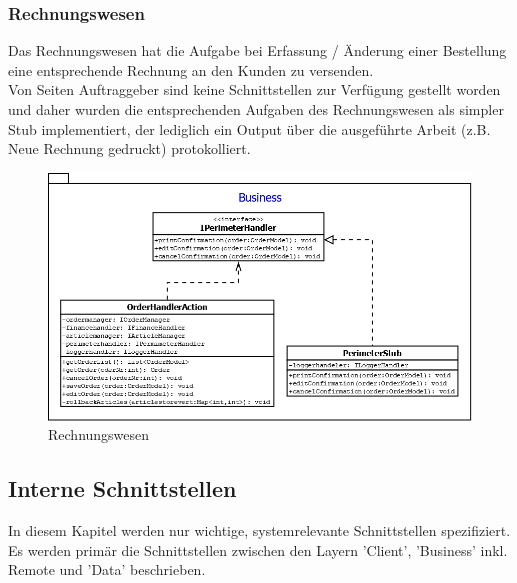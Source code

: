 \subsubsection{Rechnungswesen}
Das Rechnungswesen hat die Aufgabe bei Erfassung / Änderung einer Bestellung eine entsprechende Rechnung an den Kunden zu versenden.\\
Von Seiten Auftraggeber sind keine Schnittstellen zur Verfügung gestellt worden und daher wurden die entsprechenden Aufgaben des Rechnungswesen als simpler Stub implementiert, der lediglich ein Output über die ausgeführte Arbeit (z.B. Neue Rechnung gedruckt) protokolliert. \\
\begin{figure}[H]
\centering
	\includegraphics[width=1.0\linewidth]{Images/Rechnungswesen}
	\caption{Rechnungswesen}
	\label{fig:rechnungswesen}
\end{figure}

\subsection{Interne Schnittstellen}
In diesem Kapitel werden nur wichtige, systemrelevante Schnittstellen spezifiziert. Es werden primär die Schnittstellen zwischen den Layern 'Client', 'Business' inkl. Remote und 'Data' beschrieben.




